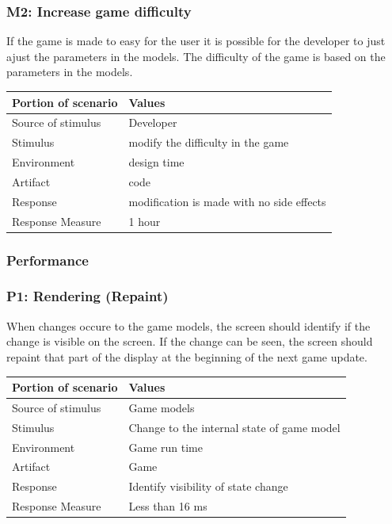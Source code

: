 \subsubsection* {M2: Increase game difficulty}
If the game is made to easy for the user it is possible for the developer to just ajust the
parameters in the models. The difficulty of the game is based on the parameters
in the models. 

\begin{tabular}{| l | l |}
	\hline
	\rowcolor{gray}
	{\bf Portion of scenario} & {\bf Values} \\ \hline
	Source of stimulus & Developer\\ \hline
	Stimulus & modify the difficulty in the game\\ \hline
	Environment & design time \\ \hline
	Artifact & code \\ \hline
	Response & modification is made with no side effects\\ \hline
	Response Measure & 1 hour\\ \hline
\end{tabular}

\subsubsection{Performance}

\subsubsection*{P1: Rendering (Repaint)}
When changes occure to the game models, the screen should identify if the change 
is visible on the screen. If the change can be seen, the screen should repaint 
that part of the display at the beginning of the next game update.

\begin{tabular}{| l | l |}
	\hline
	\rowcolor{gray}
	{\bf Portion of scenario} & {\bf Values} \\ \hline
	Source of stimulus & Game models\\ \hline
	Stimulus & Change to the internal state of game model\\ \hline
	Environment & Game run time \\ \hline
	Artifact &  Game \\ \hline
	Response & Identify visibility of state change\\ \hline
	Response Measure & Less than 16 ms\\ \hline
\end{tabular}

